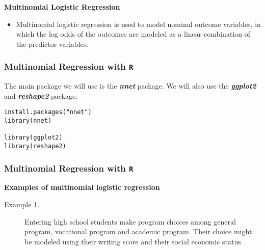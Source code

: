 \documentclass[00-GLMregslides.tex]{subfiles}
\begin{document}
	

	
\begin{frame}
\Large
	
\textbf{Multinomial Logistic Regression}\\
\bigskip
\begin{itemize}
\item Multinomial logistic regression is used to model nominal outcome variables, in which the log odds of the outcomes are modeled as a linear combination of the predictor variables.
\end{itemize}
 
\end{frame}

\begin{frame}[fragile]

\frametitle{Multinomial Regression with \texttt{R}}
\Large
The main package we will use is the \textbf{\textit{nnet}} package. We will also use the \textbf{\textit{ggplot2}} and \textbf{\textit{reshape2}} package. 

\begin{framed}
\begin{verbatim}
install.packages("nnet")
library(nnet)

library(ggplot2)
library(reshape2)
\end{verbatim}
\end{framed}



\end{frame}
\begin{frame}[fragile]
	
	\frametitle{Multinomial Regression with \texttt{R}}
	\Large
	\textbf{Examples of multinomial logistic regression}
	
	\begin{description}

		
		\item[Example 1.] Entering high school students make program choices among general program, vocational program and academic program. Their choice might be modeled using their writing score and their social economic status.
	\end{description}
\end{frame}
\end{document}
